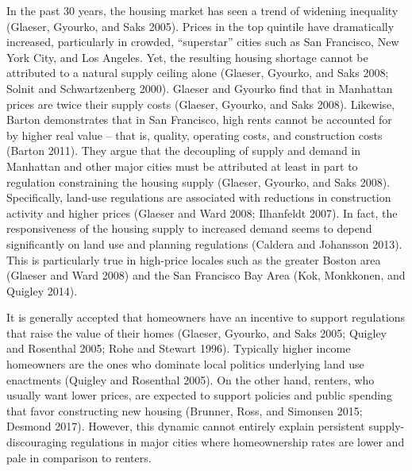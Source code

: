 \documentclass[]{article}
\begin{document}
In the past 30 years, the housing market has seen a trend of widening inequality (Glaeser, Gyourko, and Saks 2005). Prices in the top quintile have dramatically increased, particularly in crowded, ``superstar'' cities such as San Francisco, New York City, and Los Angeles. Yet, the resulting housing shortage cannot be attributed to a natural supply ceiling alone (Glaeser, Gyourko, and Saks 2008; Solnit and Schwartzenberg 2000). Glaeser and Gyourko find that in Manhattan prices are twice their supply costs (Glaeser, Gyourko, and Saks 2008). Likewise, Barton demonstrates that in San Francisco, high rents cannot be accounted for by higher real value -- that is, quality, operating costs, and construction costs (Barton 2011). They argue that the decoupling of supply and demand in Manhattan and other major cities must be attributed at least in part to regulation constraining the housing supply (Glaeser, Gyourko, and Saks 2008). Specifically, land-use regulations are associated with reductions in construction activity and higher prices (Glaeser and Ward 2008; Ilhanfeldt 2007). In fact, the responsiveness of the housing supply to increased demand seems to depend significantly on land use and planning regulations (Caldera and Johansson 2013). This is particularly true in high-price locales such as the greater Boston area (Glaeser and Ward 2008) and the San Francisco Bay Area (Kok, Monkkonen, and Quigley 2014).

It is generally accepted that homeowners have an incentive to support regulations that raise the value of their homes (Glaeser, Gyourko, and Saks 2005; Quigley and Rosenthal 2005; Rohe and Stewart 1996). Typically higher income homeowners are the ones who dominate local politics underlying land use enactments (Quigley and Rosenthal 2005). On the other hand, renters, who usually want lower prices, are expected to support policies and public spending that favor constructing new housing (Brunner, Ross, and Simonsen 2015; Desmond 2017). However, this dynamic cannot entirely explain persistent supply-discouraging regulations in major cities where homeownership rates are lower and pale in comparison to renters.
\end{document}
